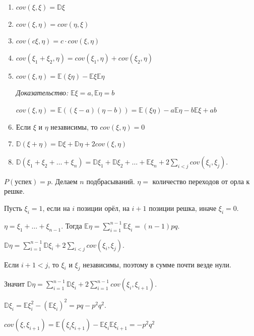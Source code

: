 \begin{properties}
    \begin{enumerate}
        \item {
            $cov (\xi, \xi) = \mathbb{D} \xi$
        }
        \item {
            $cov (\xi, \eta) = cov (\eta, \xi)$
        }
        \item {
            $cov (c\xi, \eta) = c \cdot cov (\xi, \eta)$
        }
        \item {
            $cov(\xi_1 + \xi_2, \eta) = cov(\xi_1, \eta) + cov(\xi_2, \eta)$
        }
        \item {
            $cov (\xi, \eta) = \mathbb{E} (\xi \eta) - \mathbb{E}\xi\mathbb{E}\eta$

            \textit{Доказательство: } $\mathbb{E} \xi = a, \mathbb{E} \eta = b$

            $cov(\xi, \eta) = \mathbb{E}((\xi - a)(\eta - b)) = \mathbb{E}(\xi \eta) - a\mathbb{E}\eta - b \mathbb{E} \xi + ab$
        }
        \item {
            Если $\xi$ и $\eta$ независимы, то $cov (\xi, \eta) = 0$
        }
        \item {
            $\mathbb{D} (\xi + \eta) = \mathbb{D} \xi + \mathbb{D} \eta + 2 cov (\xi, \eta)$
        }
        \item {
            $\mathbb{D} (\xi_1 + \xi_2 + \ldots + \xi_n) = \mathbb{D} \xi_1 + \mathbb{D} \xi_2 + \ldots + \mathbb{E} \xi_n + 2\sum_{i < j} cov(\xi_i, \xi_j)$.
        }
    \end{enumerate}
\end{properties}

\begin{example}
    $P(\text{успех}) = p$. Делаем $n$ подбрасываний. $\eta =$ количество переходов от орла к решке.

    Пусть $\xi_i = 1$, если на $i$ позиции орёл, на $i + 1$ позиции решка, иначе $\xi_i = 0$.

    $\eta = \xi_1 + \ldots + \xi_{n - 1}$. Тогда $\mathbb{E} \eta = \sum_{i = 1}^{n - 1} \mathbb{E} \xi_i = (n - 1)pq$.

    $\mathbb{D} \eta = \sum_{i = 1}^{n - 1} \mathbb{D}\xi_i + 2\sum_{i < j} cov(\xi_i, \xi_j)$.

    Если $i + 1 < j$, то $\xi_i$ и $\xi_j$ независимы, поэтому в сумме почти везде нули.

    Значит $\mathbb{D} \eta = \sum_{i = 1}^{n - 1} \mathbb{D}\xi_i + 2\sum_{i = 1}^{n - 1} cov(\xi_i, \xi_{i + 1})$.

    $\mathbb{D} \xi_i = \mathbb{E} \xi_i^2 - (\mathbb{E} \xi_i)^2 = pq - p^2q^2$.

    $cov(\xi, \xi_{i + 1}) = \mathbb{E} (\xi_i \xi_{i + 1}) - \mathbb{E} \xi_i \mathbb{E} \xi_{i + 1} = -p^2q^2$
\end{example}

